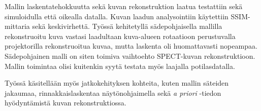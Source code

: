 \begin{titlepage}
    \newpage\thispagestyle{empty}

    Mallin laskentatehokkuutta sekä kuvan rekonstruktion laatua testattiin sekä simuloidulla että oikealla datalla. Kuvan laadun analysointiin käytettiin SSIM-mittaria sekä keskivirhettä. Työssä kehitetyllä sädepohjaisella mallilla rekonstruoitu kuva vastasi laadultaan kuva-alueen rotaatioon perustuvalla projektorilla rekonstruoitua kuvaa, mutta laskenta oli huomattavasti nopeampaa. Sädepohjainen malli on siten toimiva vaihtoehto SPECT-kuvan rekonstruktioon. Mallin toimintaa olisi kuitenkin syytä testata myös laajalla potilasdatalla.

    Työssä käsitellään myös jatkokehityksen kohteita, kuten mallin säteiden jakaumaa, rinnakkaislaskentaa näytönohjaimella sekä \textit{a priori} -tiedon hyödyntämistä kuvan rekonstruktiossa.
\end{titlepage}
